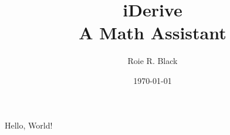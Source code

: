 \documentclass[12pt,twoside,titlepage]{book}
\title{
	{iDerive}\\
	{\large A Math Assistant}
}
\author{Roie R. Black}
\date{\today}
\begin{document}
  \frontmatter
    \maketitle

Hello, World!
\end{document}
